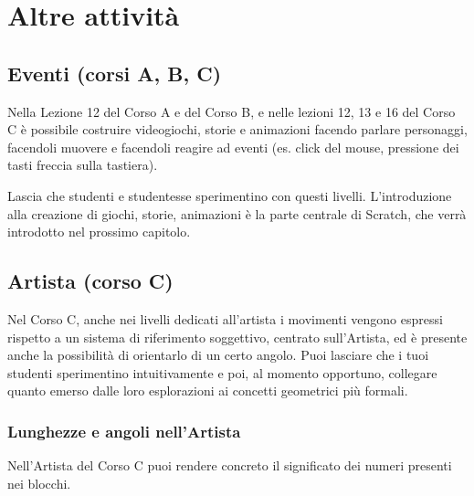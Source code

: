 \section{Altre attività }\label{altre-attivituxe0}

\ruoliattivita{\ruoloProgrammatore}

\subsection{Eventi (corsi A, B, C) }\label{eventi-corsi-a-b-c}

Nella Lezione 12 del Corso A e del Corso B, e nelle lezioni 12, 13 e 16 del Corso C è possibile costruire videogiochi, storie e animazioni facendo parlare personaggi, facendoli muovere e facendoli reagire ad eventi (es. click del mouse, pressione dei tasti freccia sulla tastiera).

Lascia che studenti e studentesse sperimentino con questi livelli. L'introduzione alla creazione di giochi, storie, animazioni è la parte centrale di Scratch, che verrà introdotto nel prossimo capitolo.

\subsection{Artista (corso C) }\label{artista-corso-c}

Nel Corso C, anche nei livelli dedicati all'artista i movimenti vengono espressi rispetto a un sistema di riferimento soggettivo, centrato sull'Artista, ed è presente anche la possibilità di orientarlo di un certo angolo. Puoi lasciare che i tuoi studenti sperimentino intuitivamente e poi, al momento opportuno, collegare quanto emerso dalle loro esplorazioni ai concetti geometrici più formali.


\subsubsection{Lunghezze e angoli nell'Artista}

\ruoliattivita{\ruoloProgrammatore\quad\ruoloEsecutore}

Nell'Artista del Corso C puoi rendere concreto il significato dei numeri presenti nei blocchi.

